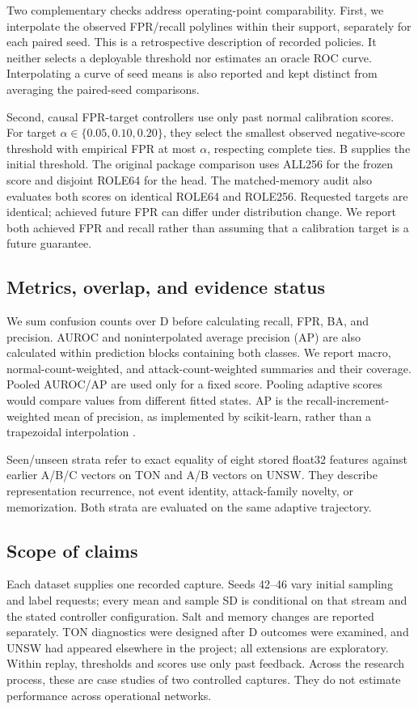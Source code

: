 Two complementary checks address operating-point comparability. First, we interpolate the observed FPR/recall polylines within their support, separately for each paired seed. This is a retrospective description of recorded policies. It neither selects a deployable threshold nor estimates an oracle ROC curve. Interpolating a curve of seed means is also reported and kept distinct from averaging the paired-seed comparisons.

Second, causal FPR-target controllers use only past normal calibration scores. For target $\alpha\in\{0.05,0.10,0.20\}$, they select the smallest observed negative-score threshold with empirical FPR at most $\alpha$, respecting complete ties. B supplies the initial threshold. The original package comparison uses ALL256 for the frozen score and disjoint ROLE64 for the head. The matched-memory audit also evaluates both scores on identical ROLE64 and ROLE256. Requested targets are identical; achieved future FPR can differ under distribution change. We report both achieved FPR and recall rather than assuming that a calibration target is a future guarantee.

\subsection{Metrics, overlap, and evidence status}
We sum confusion counts over D before calculating recall, FPR, BA, and precision. AUROC and noninterpolated average precision (AP) are also calculated within prediction blocks containing both classes. We report macro, normal-count-weighted, and attack-count-weighted summaries and their coverage. Pooled AUROC/AP are used only for a fixed score. Pooling adaptive scores would compare values from different fitted states. AP is the recall-increment-weighted mean of precision, as implemented by scikit-learn, rather than a trapezoidal interpolation \citep{pedregosa2011,sklearnap}.

Seen/unseen strata refer to exact equality of eight stored float32 features against earlier A/B/C vectors on TON and A/B vectors on UNSW. They describe representation recurrence, not event identity, attack-family novelty, or memorization. Both strata are evaluated on the same adaptive trajectory.

\subsection{Scope of claims}
Each dataset supplies one recorded capture. Seeds 42--46 vary initial sampling and label requests; every mean and sample SD is conditional on that stream and the stated controller configuration. Salt and memory changes are reported separately. TON diagnostics were designed after D outcomes were examined, and UNSW had appeared elsewhere in the project; all extensions are exploratory. Within replay, thresholds and scores use only past feedback. Across the research process, these are case studies of two controlled captures. They do not estimate performance across operational networks.

